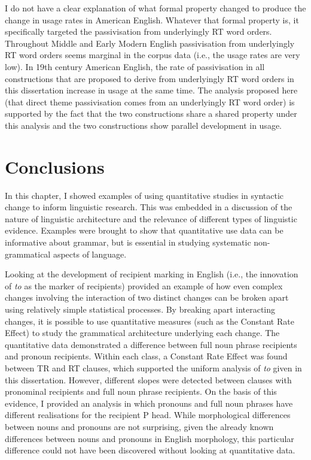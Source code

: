 	I do not have a clear explanation of what formal property changed to produce the change in usage rates in American English. Whatever that formal property is, it specifically targeted the passivisation from underlyingly RT word orders. Throughout Middle and Early Modern English passivisation from underlyingly RT word orders seems marginal in the corpus data (i.e., the usage rates are very low). In 19th century American English, the rate of passivisation in all constructions that are proposed to derive from underlyingly RT word orders in this dissertation increase in usage at the same time. The analysis proposed here (that direct theme passivisation comes from an underlyingly RT word order) is supported by the fact that the two constructions share a shared property under this analysis and the two constructions show parallel development in usage.


\section{Conclusions}
	In this chapter, I showed examples of using quantitative studies in syntactic change to inform linguistic research. This was embedded in a discussion of the nature of linguistic architecture and the relevance of different types of linguistic evidence. Examples were brought to show that quantitative use data can be informative about grammar, but is essential in studying systematic non-grammatical aspects of language.
	
	Looking at the development of recipient marking in English (i.e., the innovation of \textit{to} as the marker of recipients) provided an example of how even complex changes involving the interaction of two distinct changes can be broken apart using relatively simple statistical processes. By breaking apart interacting changes, it is possible to use quantitative measures (such as the Constant Rate Effect) to study the grammatical architecture underlying each change. The quantitative data demonstrated a difference between full noun phrase recipients and pronoun recipients. Within each class, a Constant Rate Effect was found between TR and RT clauses, which supported the uniform analysis of \textit{to} given in this dissertation. However, different slopes were detected between clauses with pronominal recipients and full noun phrase recipients. On the basis of this evidence, I provided an analysis in which pronouns and full noun phrases have different realisations for the recipient P head. While morphological differences between nouns and pronouns are not surprising, given the already known differences between nouns and pronouns in English morphology, this particular difference could not have been discovered without looking at quantitative data.
	
